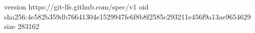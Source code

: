 version https://git-lfs.github.com/spec/v1
oid sha256:4e582b359db76641304e1529947fe6f8b8f2585c293211e456f9a13ae9654629
size 283162

